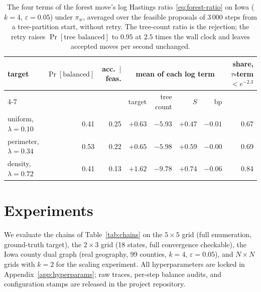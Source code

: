 \documentclass[11pt]{article}
\begin{document}
\begin{table}[htbp]
\centering
\footnotesize
\begin{tabular}{lrrrrrrr}
\toprule
target & $\Pr[\text{balanced}]$ & acc.\ $\mid$ feas. &
 \multicolumn{4}{c}{mean of each log term} & share, $\tau$-term $< e^{-2.3}$ \\
\cmidrule(lr){4-7}
 & & & target & tree count & $S$ & bp & \\
\midrule
uniform, $\lambda = 0.10$   & 0.41 & 0.25 & $+0.63$ & $-5.93$ & $+0.47$ & $-0.01$ & 0.67 \\
perimeter, $\lambda = 0.34$ & 0.53 & 0.22 & $+0.65$ & $-5.98$ & $+0.59$ & $-0.00$ & 0.69 \\
density, $\lambda = 0.72$   & 0.41 & 0.13 & $+1.62$ & $-9.78$ & $+0.74$ & $-0.06$ & 0.84 \\
\bottomrule
\end{tabular}
\caption{The four terms of the forest move's log Hastings
  ratio~\eqref{eq:forest-ratio} on Iowa ($k = 4$,
  $\varepsilon = 0.05$) under $\pi_w$, averaged over the feasible
  proposals of 3\,000 steps from a tree-partition start, without
  retry. The tree-count ratio is the rejection; the retry raises
  $\Pr[\text{tree balanced}]$ to $0.95$ at $2.5$ times the wall clock
  and leaves accepted moves per second unchanged.}\label{tab:decomposition}
\end{table}

\section{Experiments}\label{sec:experiments}

We evaluate the chains of Table~\ref{tab:chains} on the
$5 \times 5$ grid (full enumeration, ground-truth target), the
$2 \times 3$ grid (18 states, full convergence checkable), the Iowa
county dual graph (real geography, 99 counties, $k = 4$,
$\varepsilon = 0.05$), and $N \times N$ grids with $k = 2$ for the
scaling experiment. All hyperparameters are locked in
Appendix~\ref{app:hyperparams}; raw traces, per-step balance audits,
and configuration stamps are released in the project repository.
\end{document}
